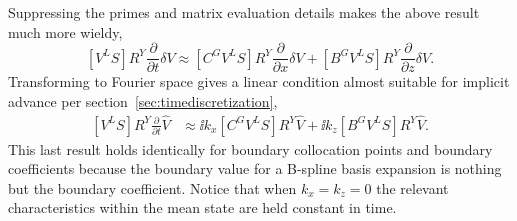Suppressing the primes and matrix evaluation details makes the above result
much more wieldy,
\[
\label{eq:dimeulertransformcharnotYphys}
  \left[V^L S\right]
  R^Y
  \frac{\partial}{\partial{}t}
  \delta{}V
\approx
  \left[C^G V^L S\right]
  R^Y
  \frac{\partial}{\partial{}x}
  \delta{}V
  +
  \left[B^G V^L S\right]
  R^Y
  \frac{\partial}{\partial{}z}
  \delta{}V
.
\]
Transforming to Fourier space gives a linear condition almost suitable for
implicit advance per section~\ref{sec:timediscretization},
\begin{align}
\label{eq:dimeulertransformcharnotYwave}
  \left[V^L S\right]
  R^Y
  \frac{\partial}{\partial{}t}
  \hat{V}
&\approx
  \ii k_x
  \left[C^G V^L S\right]
  R^Y
  \hat{V}
  +
  \ii k_z
  \left[B^G V^L S\right]
  R^Y
  \hat{V}
.
\end{align}
This last result holds identically for boundary collocation points and boundary
coefficients because the boundary value for a B-spline basis expansion is
nothing but the boundary coefficient.  Notice that when $k_x=k_z=0$ the
relevant characteristics within the mean state are held constant in time.

